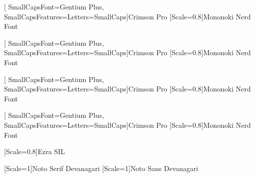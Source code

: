 
[
	SmallCapsFont=Gentium Plus,
	SmallCapsFeatures={Letters=SmallCaps}]{Crimson Pro}
[Scale=0.8]{Mononoki Nerd Font}

[
	SmallCapsFont=Gentium Plus,
	SmallCapsFeatures={Letters=SmallCaps}]{Crimson Pro}
[Scale=0.8]{Mononoki Nerd Font}

[
	SmallCapsFont=Gentium Plus,
	SmallCapsFeatures={Letters=SmallCaps}]{Crimson Pro}
[Scale=0.8]{Mononoki Nerd Font}

[
	SmallCapsFont=Gentium Plus,
	SmallCapsFeatures={Letters=SmallCaps}]{Crimson Pro}
[Scale=0.8]{Mononoki Nerd Font}



[Scale=0.8]{Ezra SIL}






[Scale=1]{Noto Serif Devanagari}
[Scale=1]{Noto Sans Devanagari}
